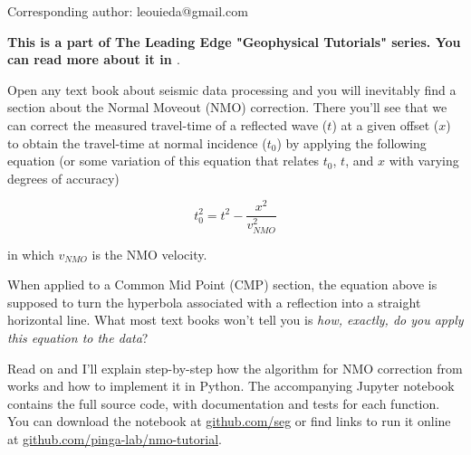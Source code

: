 Corresponding author: leouieda@gmail.com

\textbf{This is a part of The Leading Edge "Geophysical Tutorials" series.
You can read more about it in \citet{Hall_2016a}}.

Open any text book about seismic data processing and you will inevitably find a
section about the Normal Moveout (NMO) correction.
There you'll see that we can correct the measured travel-time of a reflected
wave ($t$) at a given offset ($x$) to obtain the travel-time at normal
incidence ($t_0$) by applying the following equation 
(or some variation of this equation that relates $t_0$, $t$, and $x$ with varying degrees of accuracy)

\begin{equation}
t_0^2=t^2-\dfrac{x^2}{v_{NMO}^2}
\label{eq:traveltime}
\end{equation}

in which $v_{NMO}$ is the NMO velocity.

When applied to a Common Mid Point (CMP) section, the equation above is
supposed to turn the hyperbola associated with a reflection into a straight
horizontal line.
What most text books won't tell you is \textit{how, exactly, do you apply this
equation to the data}?

Read on and I'll explain step-by-step how the algorithm for NMO correction from
\citet{Yilmaz_2001} works and how to implement it in Python.
The accompanying Jupyter notebook \citep{Perez_2007} contains the full source
code, with documentation and tests for each function.
You can download the notebook at
\href{https://github.com/seg}{github.com/seg} or
find links to run it online at
\href{https://github.com/pinga-lab/nmo-tutorial}{github.com/pinga-lab/nmo-tutorial}.
